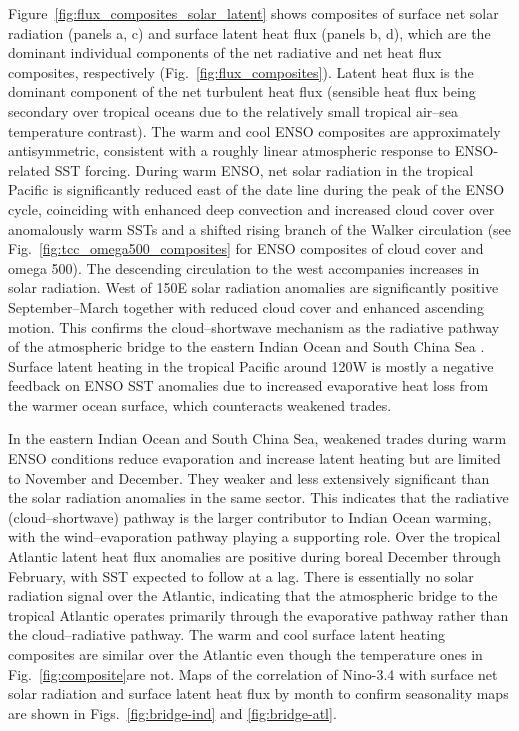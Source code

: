 \documentclass{ametsocV6.1}
\begin{document}
Figure~\ref{fig:flux_composites_solar_latent} shows composites
    of surface net solar radiation (panels a, c) and surface latent
    heat flux (panels b, d), which are the dominant individual
    components of the net radiative and net heat flux composites,
    respectively (Fig.\ \ref{fig:flux_composites}). Latent heat flux is the dominant component of the net
    turbulent heat flux (sensible heat flux being secondary over
    tropical oceans due to the relatively small tropical air–sea
    temperature contrast). The warm and cool ENSO composites are approximately
    antisymmetric, consistent with a roughly linear atmospheric
    response to ENSO-related SST forcing. During warm ENSO, net solar radiation in the tropical Pacific
    is significantly reduced east of the date line during the peak of
    the ENSO cycle, coinciding with enhanced deep convection and
    increased cloud cover over anomalously warm SSTs and a shifted
    rising branch of the Walker circulation (see Fig.\
    \ref{fig:tcc_omega500_composites} for ENSO composites of cloud
    cover and omega 500). The descending circulation to the west
    accompanies increases in solar radiation. West of 150E solar radiation anomalies are significantly
    positive September--March together with reduced cloud cover and
    enhanced ascending motion. This confirms the cloud--shortwave
    mechanism as the radiative pathway of the atmospheric bridge to
    the eastern Indian Ocean and South China Sea
    \citep{Klein1999remote}. Surface latent heating in the tropical Pacific around 120W is
    mostly a negative feedback on ENSO SST anomalies due to increased
    evaporative heat loss from the warmer ocean surface, which
    counteracts weakened trades.

    In the eastern Indian Ocean and South China Sea, weakened trades
    during warm ENSO conditions reduce evaporation and increase latent
    heating but are limited to November and December. They weaker and
    less extensively significant than the solar radiation anomalies in
    the same sector. This indicates that the radiative
    (cloud--shortwave) pathway is the larger contributor to Indian
    Ocean warming, with the wind--evaporation pathway playing a
    supporting role. Over the tropical Atlantic latent heat flux anomalies are
    positive during boreal December through February, with SST
    expected to follow at a lag. There is essentially no solar
    radiation signal over the Atlantic, indicating that the
    atmospheric bridge to the tropical Atlantic operates primarily
    through the evaporative pathway rather than the cloud--radiative
    pathway. The warm and cool surface latent heating composites are
    similar over the Atlantic even though the temperature ones in
    Fig.\ \ref{fig:composite}are not. Maps of the correlation of Nino-3.4 with surface net solar
    radiation and surface latent heat flux by month to confirm
    seasonality maps are shown in Figs.\ \ref{fig:bridge-ind} and
    \ref{fig:bridge-atl}.
\end{document}
